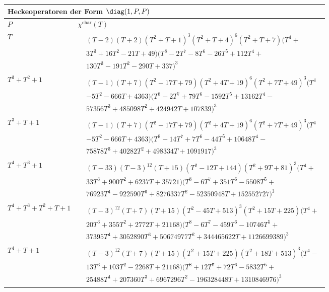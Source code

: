 \begin{tabular}{| l | l |}
\multicolumn{2}{l}{\bf Heckeoperatoren der Form $\diag(1,P,P)$} \\
\hline
$P$ & $\chi^\text{char}(T)$ \\
\hline
$T$ &
$\!\begin{aligned}
	&(T - 2)(T + 2)(T^{2} + T + 1)^{3}(T^{2} + T + 4)^{6}(T^{2} + T + 7)(T^{4} + \\&
3T^{3} + 16T^{2} - 21T + 49)(T^{8} - 2T^{7} - 8T^{6} - 26T^{5} + 112T^{4} + \\&
130T^{3} - 191T^{2} - 290T + 337)^{3}\end{aligned}$ \\
\hline
$T^3 + T^2 + 1$ &
$\!\begin{aligned}
	&(T - 1)(T + 7)(T^{2} - 17T + 79)(T^{2} + 4T + 19)^{6}(T^{2} + 7T + 49)^{3}(T^{4}\\&
- 5T^{2} - 666T + 4363)(T^{8} - 2T^{7} + 79T^{6} - 1592T^{5} + 13162T^{4} - \\&
57356T^{3} + 485098T^{2} + 424942T + 107839)^{3}\end{aligned}$ \\
\hline
$T^3 + T + 1$ &
$\!\begin{aligned}
	&(T - 1)(T + 7)(T^{2} - 17T + 79)(T^{2} + 4T + 19)^{6}(T^{2} + 7T + 49)^{3}(T^{4}\\&
- 5T^{2} - 666T + 4363)(T^{8} - 14T^{7} + 7T^{6} - 44T^{5} + 10648T^{4} - \\&
75878T^{3} + 40282T^{2} + 498334T + 1091917)^{3}\end{aligned}$ \\
\hline
$T^4 + T^3 + 1$ &
$\!\begin{aligned}
	&(T - 33)(T - 3)^{12}(T + 15)(T^{2} - 12T + 144)(T^{2} + 9T + 81)^{3}(T^{4} + \\&
33T^{3} + 900T^{2} + 6237T + 35721)(T^{8} - 6T^{7} + 351T^{6} - 5508T^{5} + \\&
76923T^{4} - 922590T^{3} + 8276337T^{2} - 52350948T + 152552727)^{3}\end{aligned}$ \\
\hline
$T^4 + T^3 + T^2 + T + 1$ &
$\!\begin{aligned}
	&(T - 3)^{12}(T + 7)(T + 15)(T^{2} - 45T + 513)^{3}(T^{2} + 15T + 225)(T^{4} + \\&
20T^{3} + 355T^{2} + 2772T + 21168)(T^{8} - 6T^{7} - 459T^{6} - 10746T^{5} + \\&
37395T^{4} + 3052890T^{3} + 50674977T^{2} + 344465622T + 1126699389)^{3}\end{aligned}$ \\
\hline
$T^4 + T + 1$ &
$\!\begin{aligned}
	&(T - 3)^{12}(T + 7)(T + 15)(T^{2} + 15T + 225)(T^{2} + 18T + 513)^{3}(T^{4} - \\&
13T^{3} + 103T^{2} - 2268T + 21168)(T^{8} + 12T^{7} + 72T^{6} - 5832T^{5} + \\&
25488T^{4} + 207360T^{3} + 6967296T^{2} - 196328448T + 1310846976)^{3}\end{aligned}$ \\
\hline
\end{tabular}


